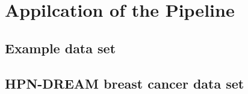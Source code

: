 \chapter{Appilcation of the Pipeline}
\section{Example data set}

\section{HPN-DREAM breast cancer data set}



